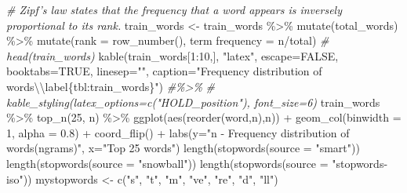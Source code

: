 \documentclass[
]{article}
\newenvironment{Shaded}{}{}
\newcommand{\AttributeTok}[1]{\textcolor[rgb]{0.49,0.56,0.16}{#1}}
\newcommand{\CommentTok}[1]{\textcolor[rgb]{0.38,0.63,0.69}{\textit{#1}}}
\newcommand{\ConstantTok}[1]{\textcolor[rgb]{0.53,0.00,0.00}{#1}}
\newcommand{\DecValTok}[1]{\textcolor[rgb]{0.25,0.63,0.44}{#1}}
\newcommand{\FloatTok}[1]{\textcolor[rgb]{0.25,0.63,0.44}{#1}}
\newcommand{\FunctionTok}[1]{\textcolor[rgb]{0.02,0.16,0.49}{#1}}
\newcommand{\NormalTok}[1]{#1}
\newcommand{\OtherTok}[1]{\textcolor[rgb]{0.00,0.44,0.13}{#1}}
\newcommand{\SpecialCharTok}[1]{\textcolor[rgb]{0.25,0.44,0.63}{#1}}
\newcommand{\StringTok}[1]{\textcolor[rgb]{0.25,0.44,0.63}{#1}}
\begin{document}
\begin{Shaded}
\begin{Highlighting}[]
\CommentTok{\# Zipf’s law states that the frequency that a word appears is inversely proportional to its rank.}
\NormalTok{train\_words }\OtherTok{\textless{}{-}}\NormalTok{ train\_words }\SpecialCharTok{\%\textgreater{}\%}
    \FunctionTok{mutate}\NormalTok{(total\_words) }\SpecialCharTok{\%\textgreater{}\%}
     \FunctionTok{mutate}\NormalTok{(}\AttributeTok{rank =} \FunctionTok{row\_number}\NormalTok{(),}
         \StringTok{\textasciigrave{}}\AttributeTok{term frequency}\StringTok{\textasciigrave{}} \OtherTok{=}\NormalTok{ n}\SpecialCharTok{/}\NormalTok{total)}
\CommentTok{\# head(train\_words)}
\FunctionTok{kable}\NormalTok{(train\_words[}\DecValTok{1}\SpecialCharTok{:}\DecValTok{10}\NormalTok{,], }\StringTok{"latex"}\NormalTok{, }\AttributeTok{escape=}\ConstantTok{FALSE}\NormalTok{, }\AttributeTok{booktabs=}\ConstantTok{TRUE}\NormalTok{, }\AttributeTok{linesep=}\StringTok{""}\NormalTok{, }\AttributeTok{caption=}\StringTok{"Frequency distribution of words}\SpecialCharTok{\textbackslash{}\textbackslash{}}\StringTok{label\{tbl:train\_words\}"}\NormalTok{) }\CommentTok{\#\%\textgreater{}\%}
    \CommentTok{\# kable\_styling(latex\_options=c("HOLD\_position"), font\_size=6)}
\NormalTok{train\_words }\SpecialCharTok{\%\textgreater{}\%}
  \FunctionTok{top\_n}\NormalTok{(}\DecValTok{25}\NormalTok{, n) }\SpecialCharTok{\%\textgreater{}\%}
  \FunctionTok{ggplot}\NormalTok{(}\FunctionTok{aes}\NormalTok{(}\FunctionTok{reorder}\NormalTok{(word,n),n)) }\SpecialCharTok{+}
  \FunctionTok{geom\_col}\NormalTok{(}\AttributeTok{binwidth =} \DecValTok{1}\NormalTok{, }\AttributeTok{alpha =} \FloatTok{0.8}\NormalTok{) }\SpecialCharTok{+}
   \FunctionTok{coord\_flip}\NormalTok{() }\SpecialCharTok{+}
  \FunctionTok{labs}\NormalTok{(}\AttributeTok{y=}\StringTok{"n {-} Frequency distribution of words(ngrams)"}\NormalTok{,}
       \AttributeTok{x=}\StringTok{"Top 25 words"}\NormalTok{)}
\FunctionTok{length}\NormalTok{(}\FunctionTok{stopwords}\NormalTok{(}\AttributeTok{source =} \StringTok{"smart"}\NormalTok{))}
\FunctionTok{length}\NormalTok{(}\FunctionTok{stopwords}\NormalTok{(}\AttributeTok{source =} \StringTok{"snowball"}\NormalTok{))}
\FunctionTok{length}\NormalTok{(}\FunctionTok{stopwords}\NormalTok{(}\AttributeTok{source =} \StringTok{"stopwords{-}iso"}\NormalTok{))}
\NormalTok{mystopwords }\OtherTok{\textless{}{-}} \FunctionTok{c}\NormalTok{(}\StringTok{"s"}\NormalTok{, }\StringTok{"t"}\NormalTok{, }\StringTok{"m"}\NormalTok{, }\StringTok{"ve"}\NormalTok{, }\StringTok{"re"}\NormalTok{, }\StringTok{"d"}\NormalTok{, }\StringTok{"ll"}\NormalTok{)}


\end{Highlighting}
\end{Shaded}
\end{document}
